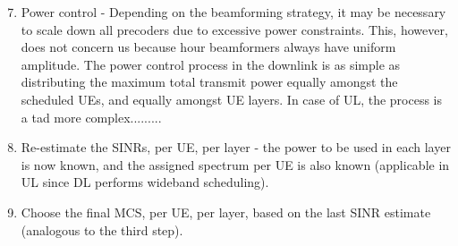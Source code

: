 \begin{enumerate} \setcounter{enumi}{6}
    \item Power control - Depending on the beamforming strategy, it may be necessary to scale down all precoders due to excessive power constraints. This, however, does not concern us because hour beamformers always have uniform amplitude. The power control process in the downlink is as simple as distributing the maximum total transmit power equally amongst the scheduled UEs, and equally amongst UE layers. In case of UL, the process is a tad more complex.........
    
    
    \item Re-estimate the \acsp{SINR}, per \ac{UE}, per layer - the power to be used in each layer is now known, and the assigned spectrum per UE is also known (applicable in UL since DL performs wideband scheduling).
    \item Choose the final MCS, per UE, per layer, based on the last SINR estimate (analogous to the third step).
\end{enumerate}

